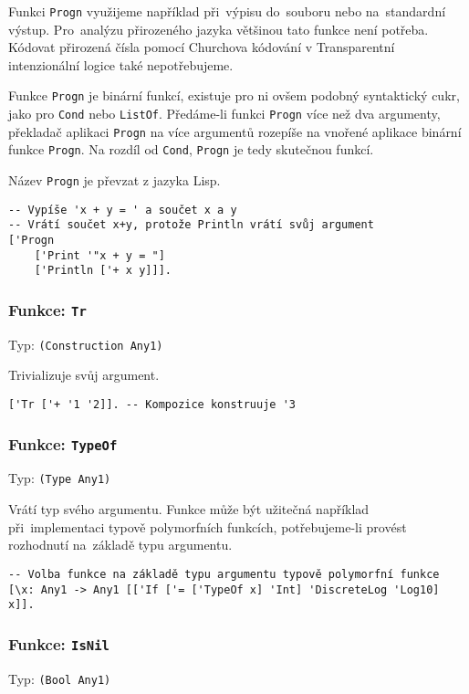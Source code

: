 Funkci \lstinline{Progn} využijeme například při~výpisu do~souboru nebo na~standardní výstup.
Pro~analýzu přirozeného jazyka většinou tato funkce není potřeba. Kódovat přirozená čísla pomocí
Churchova kódování v Transparentní intenzionální logice také nepotřebujeme.

Funkce \lstinline{Progn} je binární funkcí, existuje pro ni ovšem podobný syntaktický cukr, jako pro
\lstinline{Cond} nebo \lstinline{ListOf}. Předáme-li funkci \lstinline{Progn} více než dva
argumenty, překladač aplikaci \lstinline{Progn} na více argumentů rozepíše na vnořené aplikace
binární funkce \lstinline{Progn}. Na rozdíl od \lstinline{Cond}, \lstinline{Progn} je tedy
skutečnou funkcí.

Název \lstinline{Progn} je převzat z jazyka Lisp.

\begin{lstlisting}[caption={Ukázka využití Progn}]
-- Vypíše 'x + y = ' a součet x a y
-- Vrátí součet x+y, protože Println vrátí svůj argument
['Progn
    ['Print '"x + y = "]
    ['Println ['+ x y]]].
\end{lstlisting}

\subsubsection*{Funkce: \lstinline{Tr}}
Typ: \lstinline{(Construction Any1)}

Trivializuje svůj argument.

\begin{lstlisting}[caption={Ukázka využití Tr}]
['Tr ['+ '1 '2]]. -- Kompozice konstruuje '3
\end{lstlisting}

\subsubsection*{Funkce: \lstinline{TypeOf}}
Typ: \lstinline{(Type Any1)}

Vrátí typ svého argumentu. Funkce může být užitečná například při~implementaci typově polymorfních
funkcích, potřebujeme-li provést rozhodnutí na~základě typu argumentu.

\begin{lstlisting}[caption={Ukázka využití TypeOf}]
-- Volba funkce na základě typu argumentu typově polymorfní funkce
[\x: Any1 -> Any1 [['If ['= ['TypeOf x] 'Int] 'DiscreteLog 'Log10] x]].
\end{lstlisting}

\subsubsection*{Funkce: \lstinline{IsNil}}
Typ: \lstinline{(Bool Any1)}

